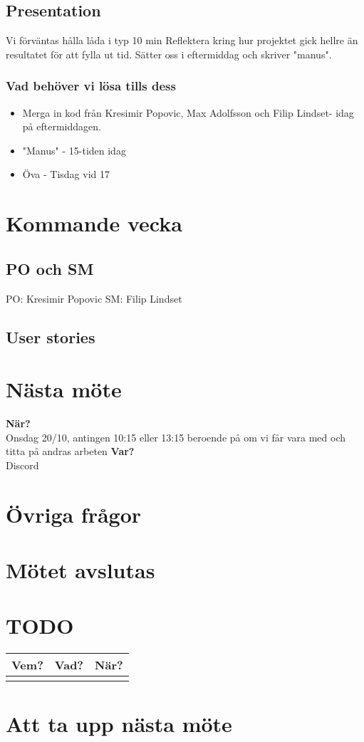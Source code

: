 \documentclass[9pt]{article}
\newcommand{\Max}{Max Adolfsson\xspace}
\newcommand{\Algen}{Filip Lindset\xspace}
\newcommand{\Kres}{Kresimir Popovic\xspace}
\begin{document}
\subsection{Presentation}
Vi förväntas hålla låda i typ 10 min 
Reflektera kring hur projektet gick hellre än resultatet för att fylla ut tid. Sätter oss i eftermiddag och skriver "manus". 
\subsubsection{Vad behöver vi lösa tills dess}
\begin{itemize}
    \item Merga in kod från \Kres, \Max och \Algen - idag på eftermiddagen.
    \item "Manus" - 15-tiden idag 
    \item Öva - Tisdag vid 17 
\end{itemize}

\section{Kommande vecka}
\subsection{PO och SM}
PO: \Kres
SM: \Algen

\subsection{User stories}


\section{Nästa möte}
\textbf{När?} \\ Onsdag 20/10, antingen 10:15 eller 13:15 beroende på om vi får vara med och titta på andras arbeten 
\textbf{Var?} \\ Discord

\section{Övriga frågor}

\section{Mötet avslutas}


\appendix
\section{TODO}
\begin{tabular}{| p{3cm} | p{7.5cm} | p{3cm}|}
  \hline
  \textbf{Vem?} & \textbf{Vad?} & \textbf{När?} \\ \hline
  \textbf{} & \textbf{} & \textbf{} \\ \hline


  \end{tabular}
\section{Att ta upp nästa möte}
\end{document}
